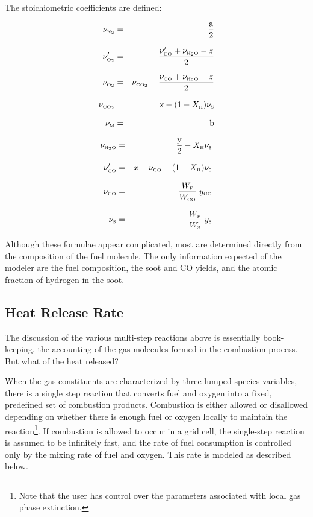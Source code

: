 The stoichiometric coefficients are defined:

\parbox{2.5in}{
\begin{eqnarray*} \nu_{\tiny \hbox{N}_2}  &=& \frac{\hbox{a}}{2}\\*[.1in]
                  \nu_{\tiny \hbox{O}_2}' &=& \frac{\nu_{\tiny \hbox{CO}}'+\nu_{\tiny \hbox{H}_2\hbox{O}}-z}{2}\\*[.1in]
                  \nu_{\tiny \hbox{O}_2}  &=& \nu_{\tiny \hbox{CO}_2} + \frac{\nu_{\tiny \hbox{CO}}+\nu_{\tiny \hbox{H}_2\hbox{O}}-z}{2}\\*[.1in]
                  \nu_{\tiny \hbox{CO}_2} &=& \hbox{x} - (1-X_{\tiny \hbox{H}}) \nu_{\tiny \hbox{S}} \\*[.1in]
                  \nu_{\tiny \hbox{M}}     &=& \hbox{b} \end{eqnarray*} }
\hfill \parbox{3.5in}{\begin{eqnarray}
                  \nu_{\tiny \hbox{H}_2\hbox{O}} &=& \frac{\hbox{y}}{2}- X_{\tiny \hbox{H}} \nu_{\tiny \hbox{S}}\\*[.1in]
                  \nu_{\tiny \hbox{CO}}'   &=& x - \nu_{\tiny \hbox{CO}} - (1-X_{\tiny \hbox{H}}) \nu_{\tiny \hbox{S}} \\*[.1in]
                  \nu_{\tiny \hbox{CO}}    &=& \frac{W_{\tiny \hbox{F}}}{W_{\tiny \hbox{CO}}} \; y_{\tiny \hbox{CO}} \\*[.1in]
                  \nu_{\tiny \hbox{S}}    &=& \frac{W_{\tiny \hbox{F}}}{W_{\tiny \hbox{S}}} \; y_{\tiny \hbox{S}}
\end{eqnarray} }
Although these formulae appear complicated, most are determined directly from the composition of the fuel molecule. The only information
expected of the modeler are the fuel composition, the soot and CO yields, and the atomic fraction of hydrogen in the soot.


\subsection{Heat Release Rate}

The discussion of the various multi-step reactions above is essentially book-keeping, the accounting of the gas
molecules formed in the combustion process. But what of the heat released?

When the gas constituents are characterized by three lumped species variables, there is a single step reaction that
converts fuel and oxygen into a
fixed, predefined set of combustion products. Combustion is either allowed or
disallowed depending on whether there is enough fuel or oxygen locally to maintain the 
reaction\footnote{Note that the user has control over the parameters associated with local gas phase extinction.}.
If combustion is allowed to occur in a grid
cell, the single-step reaction is assumed to be infinitely fast, and the rate of fuel consumption is controlled
only by the mixing rate of fuel and oxygen. This rate is modeled as described below.

